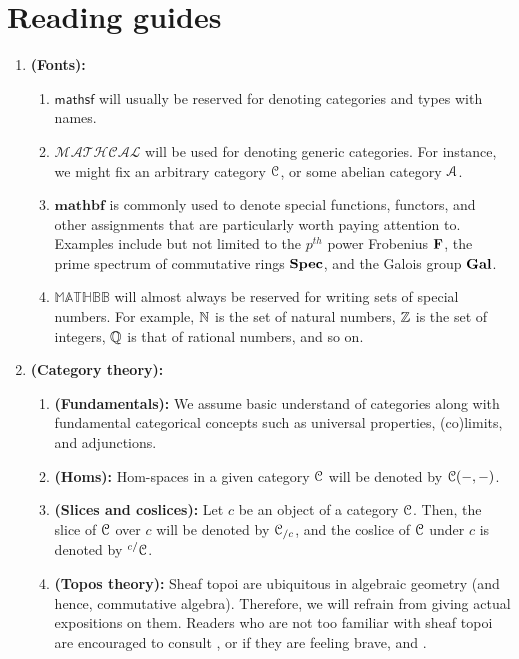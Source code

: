 \chapter{Reading guides}
    \begin{enumerate}
        \item \textbf{(Fonts):}
            \begin{enumerate}
                \item $\mathsf{mathsf}$ will usually be reserved for denoting categories and types with names. 
                \item $\mathcal{MATHCAL}$ will be used for denoting generic categories. For instance, we might fix an arbitrary category $\mathcal{C}$, or some abelian category $\mathcal{A}$. 
                \item $\mathbf{mathbf}$ is commonly used to denote special functions, functors, and other assignments that are particularly worth paying attention to. Examples include but not limited to the $p^{th}$ power Frobenius $\mathbf{F}$, the prime spectrum of commutative rings $\mathbf{Spec}$, and the Galois group $\mathbf{Gal}$.
                \item $\mathbb{MATHBB}$ will almost always be reserved for writing sets of special numbers. For example, $\mathbb{N}$ is the set of natural numbers, $\mathbb{Z}$ is the set of integers, $\mathbb{Q}$ is that of rational numbers, and so on. 
            \end{enumerate}
        \item \textbf{(Category theory):} 
            \begin{enumerate}
                \item \textbf{(Fundamentals):} We assume basic understand of categories along with fundamental categorical concepts such as universal properties, (co)limits, and adjunctions. 
                \item \textbf{(Homs):} Hom-spaces in a given category $\mathcal{C}$ will be denoted by $\mathcal{C}(-, -)$.
                \item \textbf{(Slices and coslices):} Let $c$ be an object of a category $\mathcal{C}$. Then, the slice of $\mathcal{C}$ over $c$ will be denoted by $\mathcal{C}_{/c}$, and the coslice of $\mathcal{C}$ under $c$ is denoted by ${}^{c/}\mathcal{C}$. 
                \item \textbf{(Topos theory):} Sheaf topoi are ubiquitous in algebraic geometry (and hence, commutative algebra). Therefore, we will refrain from giving actual expositions on them. Readers who are not too familiar with sheaf topoi are encouraged to consult \cite{sga4}, or if they are feeling brave, \cite{elephant1} and \cite{elephant2}. 

\end{enumerate}
\end{enumerate}

